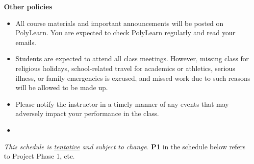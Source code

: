 \documentclass[letterpaper,12pt]{report}
\begin{document}
\textbf{Other policies}
\begin{itemize}
\item All course materials and important announcements will be posted on PolyLearn. You are expected to check PolyLearn regularly and read your emails.
\item Students are expected to attend all class meetings.  However, missing class for religious holidays, school-related travel for academics or athletics, serious illness, or family emergencies is excused, and missed work due to such reasons will be allowed to be made up.
\item Please notify the instructor in a timely manner of any events that may adversely impact your performance in the class.
\item[]
\end{itemize}

\noindent \emph{This schedule is \underline{tentative} and subject to change.}
\vskip5pt
\noindent \textbf{P1} in the schedule below refers to Project Phase 1, etc.
\end{document}

